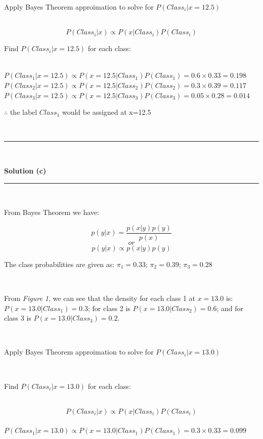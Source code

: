 \documentclass{article}
\begin{document}
\parbox{\textwidth}{Apply Bayes Theorem approimation to solve for $P(Class_i | x=12.5)$}\\

$$P(Class_i|x) \propto P(x|Class_i)P(Class_i)$$

\parbox{\textwidth}{Find $P(Class_i|x=12.5)$ for each class:}\\

$P(Class_1|x=12.5) \propto P(x=12.5|Class_1)P(Class_1) = 0.6 \times 0.33 = 0.198$\\

$P(Class_2|x=12.5) \propto P(x=12.5|Class_2)P(Class_2) = 0.3 \times 0.39 = 0.117$\\

$P(Class_3|x=12.5) \propto P(x=12.5|Class_3)P(Class_3) = 0.05 \times 0.28 = 0.014$\\

\parbox{\textwidth}{$\therefore$ the label $Class_1$ would be assigned at x=12.5}\\

\noindent\rule{\textwidth}{0.4pt}\\

\parbox{\textwidth}{\textbf{Solution (c)}}
\noindent\rule{\textwidth}{0.4pt}\\

\parbox{\textwidth}{From Bayes Theorem we have:}
$$p(y|x) = \frac{p(x|y)p(y)}{p(x)}$$
$$or$$
$$p(y|x) \propto p(x|y)p(y)$$

\parbox{\textwidth}{The class probabilities are given as: $\pi_1 = 0.33$; $\pi_2 = 0.39$; $\pi_3 = 0.28$}\\

\parbox{\textwidth}{From \textit{Figure 1}, we can see that the density for each class 1 at $x=13.0$ is: $P(x=13.0|Class_1) = 0.3$; for class 2 is $P(x=13.0|Class_2) = 0.6$; and for class 3 is $P(x=13.0|Class_3) = 0.2$.}\\

\parbox{\textwidth}{Apply Bayes Theorem approimation to solve for $P(Class_i | x=13.0)$}\\

\parbox{\textwidth}{Find $P(Class_i|x=13.0)$ for each class:}\\

$$P(Class_i|x) \propto P(x|Class_i)P(Class_i)$$\\

$P(Class_1|x=13.0) \propto P(x=13.0|Class_1)P(Class_1) = 0.3 \times 0.33 = 0.099$\\
\end{document}
